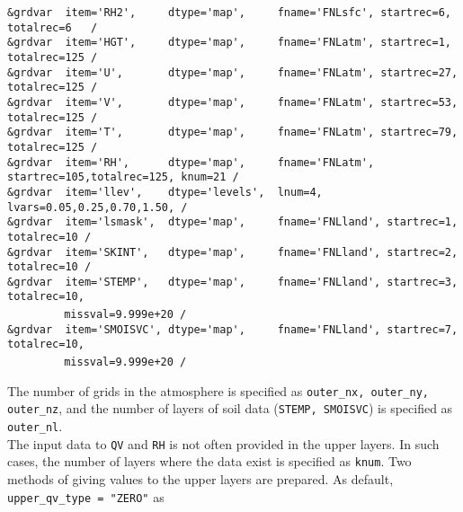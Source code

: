 {\verb|&grdvar  item='RH2',     dtype='map',     fname='FNLsfc', startrec=6,  totalrec=6   / |  \\
\verb|&grdvar  item='HGT',     dtype='map',     fname='FNLatm', startrec=1,  totalrec=125 / |  \\
\verb|&grdvar  item='U',       dtype='map',     fname='FNLatm', startrec=27, totalrec=125 / |  \\
\verb|&grdvar  item='V',       dtype='map',     fname='FNLatm', startrec=53, totalrec=125 / |  \\
\verb|&grdvar  item='T',       dtype='map',     fname='FNLatm', startrec=79, totalrec=125 / |  \\
\verb|&grdvar  item='RH',      dtype='map',     fname='FNLatm', startrec=105,totalrec=125, knum=21 /  |  \\
\verb|&grdvar  item='llev',    dtype='levels',  lnum=4, lvars=0.05,0.25,0.70,1.50, /        |  \\
\verb|&grdvar  item='lsmask',  dtype='map',     fname='FNLland', startrec=1, totalrec=10 /  |  \\
\verb|&grdvar  item='SKINT',   dtype='map',     fname='FNLland', startrec=2, totalrec=10 /  |  \\
\verb|&grdvar  item='STEMP',   dtype='map',     fname='FNLland', startrec=3, totalrec=10,|\\
~~~~~~~~\verb| missval=9.999e+20 /|  \\
\verb|&grdvar  item='SMOISVC', dtype='map',     fname='FNLland', startrec=7, totalrec=10,|\\
~~~~~~~~\verb| missval=9.999e+20 /|  \\
}

The number of grids in the atmosphere is specified as \verb|outer_nx, outer_ny, outer_nz|, and the number of layers of soil data (\verb|STEMP, SMOISVC|) is specified as \verb|outer_nl|.\\

The input data to \verb|QV| and \verb|RH| is not often provided in the upper layers.
In such cases, the number of layers where the data exist is specified as \verb|knum|. Two methods of giving values to the upper layers are prepared. As default, \verb| upper_qv_type = "ZERO"| as

